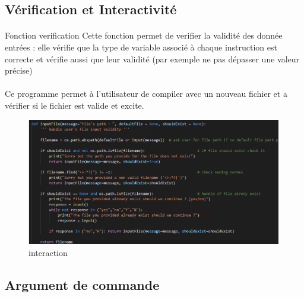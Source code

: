 \documentclass{report}
\begin{document}
		\subsection{Vérification et Interactivité}
			\paragraph{}
			Fonction verification
			Cette fonction permet de verifier la validité des donnée entrées : elle vérifie que la type de variable associé à chaque instruction est correcte et vérifie aussi que leur validité (par exemple ne pas dépasser une valeur précise)

			\paragraph{} Ce programme permet à l’utilisateur de compiler avec  un nouveau fichier et a vérifier si le fichier est valide et excite.

			\begin{figure}[h]
				\begin{center}
					\includegraphics[scale=0.85]{images/interactions.PNG}
					\caption{interaction}
				\end{center}
			\end{figure}
			
		\subsection{Argument de commande}
\end{document}
